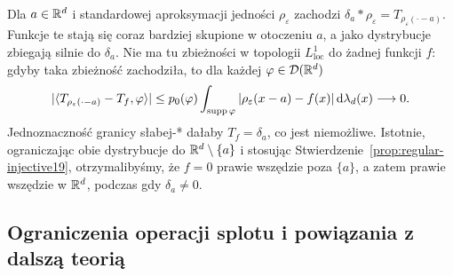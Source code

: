 \begin{przyklad}
\label{ex:delta-smooth21}
Dla $a\in\mathbb R^d$ i standardowej aproksymacji jedności
$\rho_\varepsilon$ zachodzi
$\delta_a*\rho_\varepsilon=T_{\rho_\varepsilon(\cdot-a)}$.
Funkcje te stają się coraz bardziej skupione
w otoczeniu $a$, a jako dystrybucje zbiegają
silnie do $\delta_a$. Nie ma tu zbieżności w topologii $L^1_{\mathrm{loc}}$
do żadnej funkcji $f$: gdyby taka zbieżność zachodziła,
to dla każdej $\varphi\in\mathcal D(\mathbb R^d)$
\[
 |\langle T_{\rho_\varepsilon(\cdot-a)}-T_f,\varphi\rangle|
 \le p_0(\varphi)
 \int_{\operatorname{supp}\varphi}|\rho_\varepsilon(x-a)-f(x)|
 \,\mathrm d\lambda_d(x)\longrightarrow0.
\]
Jednoznaczność granicy słabej-* dałaby $T_f=\delta_a$,
co jest niemożliwe. Istotnie, ograniczając obie dystrybucje do
$\mathbb R^d\setminus\{a\}$ i stosując
Stwierdzenie~\ref{prop:regular-injective19}, otrzymalibyśmy, że
$f=0$ prawie wszędzie poza $\{a\}$, a zatem prawie wszędzie
w $\mathbb R^d$, podczas gdy $\delta_a\ne0$.
\end{przyklad}

\subsection{Ograniczenia operacji splotu i powiązania z dalszą teorią}

